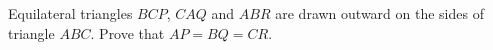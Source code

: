 Equilateral triangles $BCP$, $CAQ$ and $ABR$ are drawn outward on the sides of triangle $ABC$. Prove that $AP=BQ=CR$.
